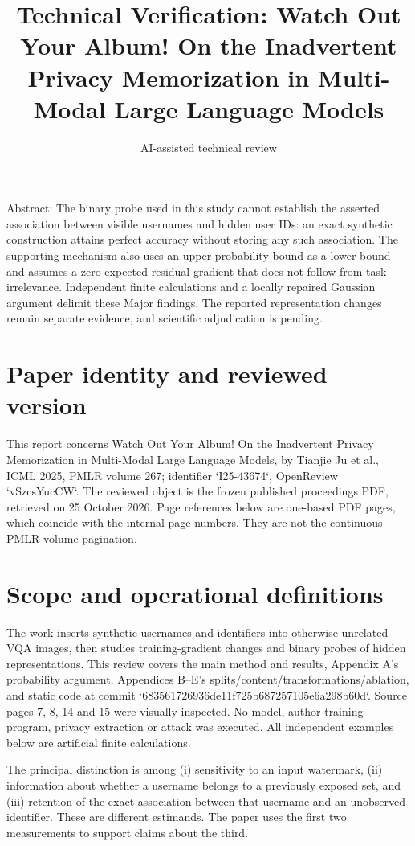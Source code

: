 \documentclass[10pt]{article}
\title{Technical Verification: Watch Out Your Album! On the Inadvertent Privacy Memorization in Multi-Modal Large Language Models}
\author{AI-assisted technical review}
\date{}
\begin{document}
\maketitle
Abstract: The binary probe used in this study cannot establish the asserted association between visible usernames and hidden user IDs: an exact synthetic construction attains perfect accuracy without storing any such association. The supporting mechanism also uses an upper probability bound as a lower bound and assumes a zero expected residual gradient that does not follow from task irrelevance. Independent finite calculations and a locally repaired Gaussian argument delimit these Major findings. The reported representation changes remain separate evidence, and scientific adjudication is pending.\par
\section*{Paper identity and reviewed version}
This report concerns Watch Out Your Album! On the Inadvertent Privacy Memorization in Multi-Modal Large Language Models, by Tianjie Ju et al., ICML 2025, PMLR volume 267; identifier `I25-43674`, OpenReview `vSzcsYucCW`. The reviewed object is the frozen published proceedings PDF, retrieved on 25 October 2026. Page references below are one-based PDF pages, which coincide with the internal page numbers. They are not the continuous PMLR volume pagination.\par
\section*{Scope and operational definitions}
The work inserts synthetic usernames and identifiers into otherwise unrelated VQA images, then studies training-gradient changes and binary probes of hidden representations. This review covers the main method and results, Appendix A’s probability argument, Appendices B–E’s splits/content/transformations/ablation, and static code at commit `683561726936de11f725b687257105e6a298b60d`. Source pages 7, 8, 14 and 15 were visually inspected. No model, author training program, privacy extraction or attack was executed. All independent examples below are artificial finite calculations.\par
The principal distinction is among (i) sensitivity to an input watermark, (ii) information about whether a username belongs to a previously exposed set, and (iii) retention of the exact association between that username and an unobserved identifier. These are different estimands. The paper uses the first two measurements to support claims about the third.\par
\end{document}
